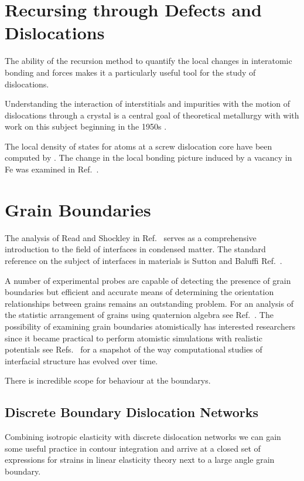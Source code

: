 \section{Recursing through Defects and Dislocations}
The ability of the recursion method to quantify the local changes in interatomic bonding and
forces makes it a particularly useful tool for the study of dislocations. 

Understanding the interaction of interstitials and impurities with the motion of
dislocations through a crystal is a central goal of theoretical metallurgy with
with work on this subject beginning in the 1950s \cite{cochardt55}.

The local density of states for atoms at a screw dislocation core have been computed by \cite{paidar81,masuda81}. 
The change in the local bonding picture induced by a vacancy in Fe was examined in Ref.~\cite{masuda82,ohta87}.

\section{Grain Boundaries}
The analysis of Read and Shockley in Ref.~\cite{read50} serves as a comprehensive
introduction to the field of interfaces in condensed matter. The 
standard reference on the subject of interfaces in materials is Sutton and 
Baluffi Ref.~\cite{sutton95}.

A number of experimental probes are capable of detecting the presence of 
grain boundaries but efficient and accurate means of determining 
the orientation relationships between grains remains an outstanding problem.
For an analysis of the statistic arrangement of grains using quaternion
algebra see Ref.~\cite{sutton96}.
The possibility of examining grain boundaries atomistically has interested
researchers since it became practical to perform atomistic simulations
with realistic potentials see Refs.~\cite{bristowe75,wolf83,paxton87,paxton88,paxtonsutton88,
kohyama88,kohyama94,paxton96,rittner96,tschopp07,momida13,du11,du12,mceniry18} for a
snapshot of the way computational studies of interfacial structure 
has evolved over time.

There is incredible scope for behaviour at the boundarys.

\subsection{Discrete Boundary Dislocation Networks}
Combining isotropic elasticity with discrete dislocation networks
we can gain some useful practice in contour integration and arrive
at a closed set of expressions for strains in linear elasticity
theory next to a large angle grain boundary. 

